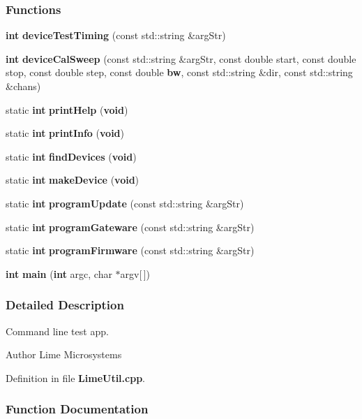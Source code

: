 \subsubsection*{Functions}
\begin{DoxyCompactItemize}
\item 
{\bf int} {\bf device\+Test\+Timing} (const std\+::string \&arg\+Str)
\item 
{\bf int} {\bf device\+Cal\+Sweep} (const std\+::string \&arg\+Str, const double start, const double stop, const double step, const double {\bf bw}, const std\+::string \&dir, const std\+::string \&chans)
\item 
static {\bf int} {\bf print\+Help} ({\bf void})
\item 
static {\bf int} {\bf print\+Info} ({\bf void})
\item 
static {\bf int} {\bf find\+Devices} ({\bf void})
\item 
static {\bf int} {\bf make\+Device} ({\bf void})
\item 
static {\bf int} {\bf program\+Update} (const std\+::string \&arg\+Str)
\item 
static {\bf int} {\bf program\+Gateware} (const std\+::string \&arg\+Str)
\item 
static {\bf int} {\bf program\+Firmware} (const std\+::string \&arg\+Str)
\item 
{\bf int} {\bf main} ({\bf int} argc, char $\ast$argv[$\,$])
\end{DoxyCompactItemize}


\subsubsection{Detailed Description}
Command line test app. 

\begin{DoxyAuthor}{Author}
Lime Microsystems 
\end{DoxyAuthor}


Definition in file {\bf Lime\+Util.\+cpp}.



\subsubsection{Function Documentation}
